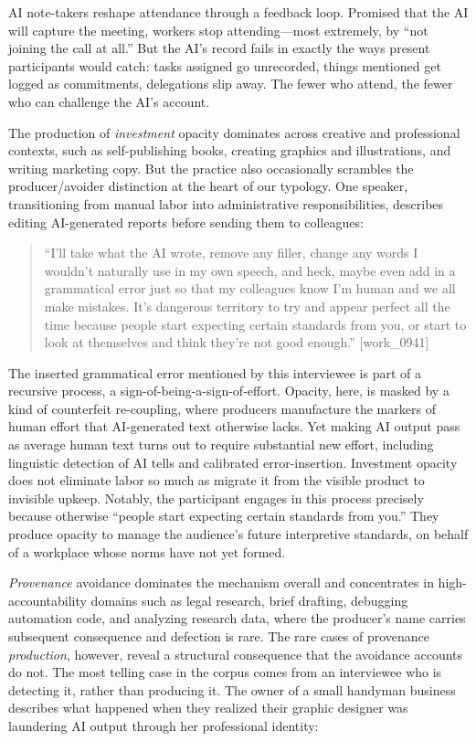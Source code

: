 \documentclass[pdflatex,sn-basic]{sn-jnl}%
\theoremstyle{thmstyleone}%
\theoremstyle{thmstyletwo}%
\theoremstyle{thmstylethree}%
\begin{document}
AI note-takers reshape attendance through a feedback loop. Promised that the AI will capture the meeting, workers stop attending---most extremely, by ``not joining the call at all.'' But the AI's record fails in exactly the ways present participants would catch: tasks assigned go unrecorded, things mentioned get logged as commitments, delegations slip away. The fewer who attend, the fewer who can challenge the AI's account. 

The production of \textit{investment} opacity dominates across creative and professional contexts, such as self-publishing books, creating graphics and illustrations, and writing marketing copy. But the practice also occasionally scrambles the producer/avoider distinction at the heart of our typology. One speaker, transitioning from manual labor into administrative responsibilities, describes editing AI-generated reports before sending them to colleagues:

\begin{quote}
``I'll take what the AI wrote, remove any filler, change any words I wouldn't naturally use in my own speech, and heck, maybe even add in a grammatical error just so that my colleagues know I'm human and we all make mistakes. It's dangerous territory to try and appear perfect all the time because people start expecting certain standards from you, or start to look at themselves and think they're not good enough.'' [work\_0941]
\end{quote}

The inserted grammatical error mentioned by this interviewee is part of a recursive process, a sign-of-being-a-sign-of-effort. Opacity, here, is masked by a kind of counterfeit re-coupling, where producers manufacture the markers of human effort that AI-generated text otherwise lacks. Yet making AI output pass as average human text turns out to require substantial new effort, including linguistic detection of AI tells and calibrated error-insertion. Investment opacity does not eliminate labor so much as migrate it from the visible product to invisible upkeep. Notably, the participant engages in this process precisely because otherwise ``people start expecting certain standards from you.'' They produce opacity to manage the audience's future interpretive standards, on behalf of a workplace whose norms have not yet formed.

\textit{Provenance} avoidance dominates the mechanism overall and concentrates in high-accountability domains such as legal research, brief drafting, debugging automation code, and analyzing research data, where the producer's name carries subsequent consequence and defection is rare. The rare cases of provenance \textit{production}, however, reveal a structural consequence that the avoidance accounts do not. The most telling case in the corpus comes from an interviewee who is detecting it, rather than producing it. The owner of a small handyman business describes what happened when they realized their graphic designer was laundering AI output through her professional identity:
\end{document}
